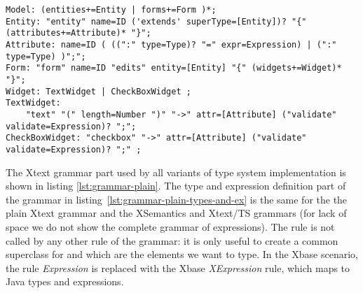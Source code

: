 % 

%

\begin{lstlisting}[language=xtext,float,label=lst:grammar-plain,caption=Grammar
with plain Xtext.] 
Model: (entities+=Entity | forms+=Form )*;
Entity: "entity" name=ID ('extends' superType=[Entity])? "{" (attributes+=Attribute)* "}";
Attribute: name=ID ( ((":" type=Type)? "=" expr=Expression) | (":" type=Type) )";";
Form: "form" name=ID "edits" entity=[Entity] "{" (widgets+=Widget)* "}";
Widget: TextWidget | CheckBoxWidget ;
TextWidget:
	"text" "(" length=Number ")" "->" attr=[Attribute] ("validate" validate=Expression)? ";";
CheckBoxWidget: "checkbox" "->" attr=[Attribute] ("validate" validate=Expression)? ";" ;
\end{lstlisting}

The Xtext grammar part used by all variants of type system implementation is
shown in listing \ref{lst:grammar-plain}. The type and expression definition part of the grammar
in listing~\ref{lst:grammar-plain-types-and-ex} is the same for the the plain
Xtext grammar and the XSemantics and Xtext/TS grammars (for lack of space we
do not show the complete grammar of expressions).
The rule  is not called by any other rule of the grammar: it is
only useful to create a common superclass for  and
 which are the elements we want to type.
In the Xbase scenario, the rule \emph{Expression} is replaced with the Xbase
\emph{XExpression} rule, which maps to Java types and expressions.

